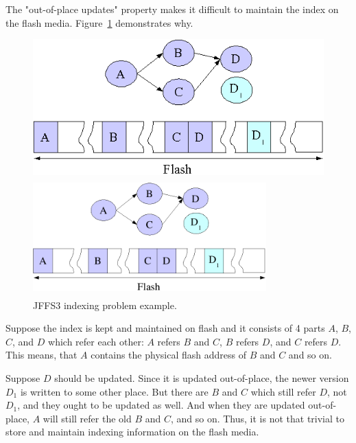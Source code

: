 The "\mbox{out-of-place} updates" property makes it difficult to maintain the
index on the flash media. Figure~\ref{ref_FigureIndexProblem} demonstrates why.

%
%
\begin{figure}[h]
\begin{center}
\begin{htmlonly}
\includegraphics{pics/idxprobl.png}
\end{htmlonly}
\includegraphics[width=90mm,height=45mm]{pics/idxprobl.pdf}
\end{center}
\caption{JFFS3 indexing problem example.}
\label{ref_FigureIndexProblem}
\end{figure}

Suppose the index is kept and maintained on flash and it consists of 4
parts $A$, $B$, $C$, and $D$ which refer each other: $A$ refers $B$ and $C$,
$B$ refers $D$, and $C$ refers $D$. This means, that $A$ contains the physical
flash address of $B$ and $C$ and so on.

Suppose $D$ should be updated. Since it is updated \mbox{out-of-place}, the
newer version $D_1$ is written to some other place. But there are $B$ and $C$
which still refer $D$, not $D_1$, and they ought to be updated as well. And
when they are updated \mbox{out-of-place}, $A$ will still refer the old $B$ and
$C$, and so on. Thus, it is not that trivial to store and maintain indexing
information on the flash media.

